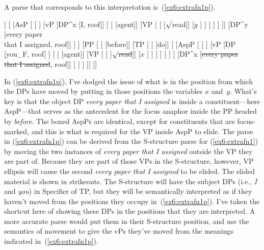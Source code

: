 A parse that corresponds to this interpretation is~(\ref{ex6:extrafn1p}).
\medskip
\begin{fullwidth}
\begin{exe}
\raggedright
	\ex \label{ex6:extrafn1p}
	\footnotesize
	\begin{forest}
	[TP
	[\ibar{T}
		[\ibar{T}
			[\obar{T} [must]]
			[ 
				[AsP [ 
					[ ]
					[vP
					[DP^x [I, roof]]
						[
							[ [agent]]
							[VP [
									[ [$\surd$read]]
									[$y$ ]
							] ]
						 ]
					 ]
				]]
				[DP^y [every paper\\ that I assigned, roof]]
			 ]
		]
		[PP [
			[]
			[TP [
				[ [do]]
				[
					[AspP [ 
						[ ]
						[vP
							[DP [you_F, roof] ]
							[
								[ [agent]]
								[VP [
									[ [\sout{$\surd$read}]]
									[$x$ ]
								] ]
							 ]
						 ]
					] ]
					[DP^x [\sout{every paper}\\ \sout{that I assigned}, roof]]
				 ]
			] ]
		]]
	]]
	\end{forest}
\end{exe}
\end{fullwidth}
\medskip
In (\ref{ex6:extrafn1p}), I've dodged the issue of what is in the position from which the DPs have moved by putting in those positions the variables $x$ and~$y$. What's key is that the object DP \emph{every paper that I assigned} is inside a constituent---here AspP---that serves as the antecedent for the focus anaphor inside the PP headed by \emph{before}. The boxed AspPs are identical, except for constituents that are focus-marked, and this is what is required for the VP inside AspP to elide. The parse in (\ref{ex6:extrafn1p}) can be derived from the S-structure parse for (\ref{ex6:extrafn1}) by moving the two instances of \emph{every paper that I assigned} outside the VP they are part of. Because they are part of those VPs in the S-structure, however, VP ellipsis will cause the second \emph{every paper that I assigned} to be elided. The elided material is shown in strikeouts. The S-structure will have the subject DPs (i.e., \emph{I} and \emph{you}) in Specifier of TP, but they will be semantically interpreted as if they haven't moved from the positions they occupy in~(\ref{ex6:extrafn1p}). I've taken the shortcut here of showing these DPs in the positions that they are interpreted. A more accurate parse would put them in their S-structure position, and use the semantics of movement to give the vPs they've moved from the meanings indicated in~(\ref{ex6:extrafn1p}).


